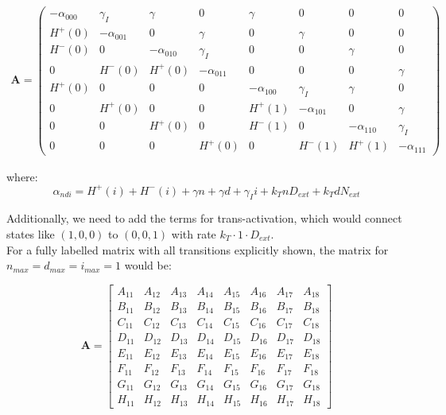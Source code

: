 \documentclass{article}
\begin{document}
\begin{flushleft}
\begin{align*}
\mathbf{A} = 
\begin{pmatrix}
-\alpha_{000} & \gamma_I & \gamma & 0 & \gamma & 0 & 0 & 0 \\
H^+(0) & -\alpha_{001} & 0 & \gamma & 0 & \gamma & 0 & 0 \\
H^-(0) & 0 & -\alpha_{010} & \gamma_I & 0 & 0 & \gamma & 0 \\
0 & H^-(0) & H^+(0) & -\alpha_{011} & 0 & 0 & 0 & \gamma \\
H^+(0) & 0 & 0 & 0 & -\alpha_{100} & \gamma_I & \gamma & 0 \\
0 & H^+(0) & 0 & 0 & H^+(1) & -\alpha_{101} & 0 & \gamma \\
0 & 0 & H^+(0) & 0 & H^-(1) & 0 & -\alpha_{110} & \gamma_I \\
0 & 0 & 0 & H^+(0) & 0 & H^-(1) & H^+(1) & -\alpha_{111}
\end{pmatrix}
\end{align*}

where:
\[
\alpha_{ndi} = H^+(i) + H^-(i) + \gamma n + \gamma d + \gamma_I i + k_T n D_{ext} + k_T d N_{ext}
\]

Additionally, we need to add the terms for trans-activation, which would connect states like $(1,0,0)$ to $(0,0,1)$ with rate $k_T \cdot 1 \cdot D_{ext}$.\\

For a fully labelled matrix with all transitions explicitly shown, the matrix for $n_{max} = d_{max} = i_{max} = 1$ would be:

\[
\mathbf{A} = 
\begin{bmatrix}
A_{11} & A_{12} & A_{13} & A_{14} & A_{15} & A_{16} & A_{17} & A_{18} \\
B_{11} & B_{12} & B_{13} & B_{14} & B_{15} & B_{16} & B_{17} & B_{18} \\
C_{11} & C_{12} & C_{13} & C_{14} & C_{15} & C_{16} & C_{17} & C_{18} \\
D_{11} & D_{12} & D_{13} & D_{14} & D_{15} & D_{16} & D_{17} & D_{18} \\
E_{11} & E_{12} & E_{13} & E_{14} & E_{15} & E_{16} & E_{17} & E_{18} \\
F_{11} & F_{12} & F_{13} & F_{14} & F_{15} & F_{16} & F_{17} & F_{18} \\
G_{11} & G_{12} & G_{13} & G_{14} & G_{15} & G_{16} & G_{17} & G_{18} \\
H_{11} & H_{12} & H_{13} & H_{14} & H_{15} & H_{16} & H_{17} & H_{18}
\end{bmatrix}
\]


\end{flushleft}
\end{document}
